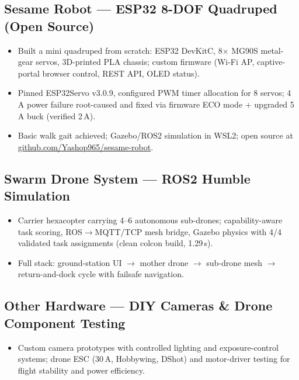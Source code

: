 \documentclass[10pt]{article}
\begin{document}
\subsection{Sesame Robot --- ESP32 8-DOF Quadruped (Open Source)}
\begin{itemize}
  \item Built a mini quadruped from scratch: ESP32 DevKitC, 8$\times$ MG90S metal-gear servos, 3D-printed PLA chassis; custom firmware (Wi-Fi AP, captive-portal browser control, REST API, OLED status).
  \item Pinned ESP32Servo v3.0.9, configured PWM timer allocation for 8 servos; 4\,A power failure root-caused and fixed via firmware ECO mode + upgraded 5\,A buck (verified 2\,A).
  \item Basic walk gait achieved; Gazebo/ROS2 simulation in WSL2; open source at \href{https://github.com/Yashop965/sesame-robot}{github.com/Yashop965/sesame-robot}.
\end{itemize}

\subsection{Swarm Drone System --- ROS2 Humble Simulation}
\begin{itemize}
  \item Carrier hexacopter carrying 4--6 autonomous sub-drones; capability-aware task scoring, ROS$\to$MQTT/TCP mesh bridge, Gazebo physics with 4/4 validated task assignments (clean colcon build, 1.29\,s).
  \item Full stack: ground-station UI $\to$ mother drone $\to$ sub-drone mesh $\to$ return-and-dock cycle with failsafe navigation.
\end{itemize}

\subsection{Other Hardware --- DIY Cameras \& Drone Component Testing}
\begin{itemize}
  \item Custom camera prototypes with controlled lighting and exposure-control systems; drone ESC (30\,A, Hobbywing, DShot) and motor-driver testing for flight stability and power efficiency.
\end{itemize}
\else
\end{document}
